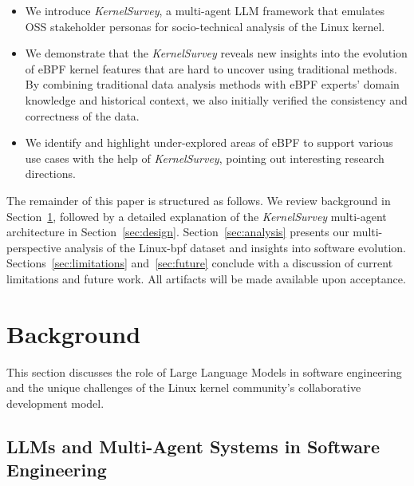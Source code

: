 \documentclass[sigconf,review,anonymous]{acmart}
\newcommand{\sys}{\textit{KernelSurvey}\xspace}
\begin{document}
\begin{itemize}
    \item We introduce \sys, a multi-agent LLM framework that emulates OSS stakeholder personas for socio-technical analysis of the Linux kernel.
    \item We demonstrate that the \emph{\sys} reveals new insights into the evolution of eBPF kernel features that are hard to uncover using traditional methods. By combining traditional data analysis methods with eBPF experts' domain knowledge and historical context, we also initially verified the consistency and correctness of the data.
    \item We identify and highlight under-explored areas of eBPF to support various use cases with the help of \emph{\sys}, pointing out interesting research directions.
\end{itemize}

The remainder of this paper is structured as follows. We review background in Section~\ref{sec:related}, followed by a detailed explanation of the \sys multi-agent architecture in Section~\ref{sec:design}. Section~\ref{sec:analysis} presents our multi-perspective analysis of the Linux-bpf dataset and insights into software evolution. Sections~\ref{sec:limitations} and~\ref{sec:future} conclude with a discussion of current limitations and future work. All artifacts will be made available upon acceptance.

\section{Background}
\label{sec:related}

This section discusses the role of Large Language Models in software engineering and the unique challenges of the Linux kernel community's collaborative development model.

\subsection{LLMs and Multi-Agent Systems in Software Engineering}
\end{document}
